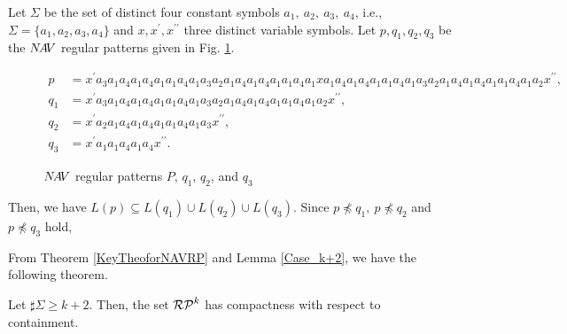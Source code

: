 \begin{ex}\label{Case_k+1}\label{反例k+1}
Let $\Sigma$ be the set of distinct four constant symbols $a_{1},~a_{2},~a_{3},~a_{4}$, i.e., $\Sigma= \{a_{1}, a_{2}, a_{3}, a_{4} \}$ and $x,x^{\prime},x^{\prime\prime}$ three distinct variable symbols.
Let $p,q_{1},q_{2},q_{3}$ be the $N\!A\!V$ regular patterns given in Fig. \ref{Fig:CounterExampleforNAVR}. 
\begin{figure*}[tb]
\begin{align*}
p & = x^{\prime}a_{3}a_{1}a_{4}a_{1}a_{4}a_{1}a_{1}a_{4}a_{1}a_{3}a_{2}a_{1}a_{4}a_{1}a_{4}a_{1}a_{1}a_{4}a_{1}xa_{1}a_{4}a_{1}a_{4}a_{1}a_{1}a_{4}a_{1}a_{3}a_{2}a_{1}a_{4}a_{1}a_{4}a_{1}a_{1}a_{4}a_{1}a_{2}x^{\prime\prime},\\
q_{1} & = x^{\prime}a_{3}a_{1}a_{4}a_{1}a_{4}a_{1}a_{1}a_{4}a_{1}a_{3}a_{2}a_{1}a_{4}a_{1}a_{4}a_{1}a_{1}a_{4}a_{1}a_{2}x^{\prime\prime},\\
q_{2} & = x^{\prime}a_{2}a_{1}a_{4}a_{1}a_{4}a_{1}a_{1}a_{4}a_{1}a_{3}x^{\prime\prime},\\
q_{3} & = x^{\prime}a_{1}a_{1}a_{4}a_{1}a_{4}x^{\prime\prime}.
\end{align*}
\caption{$N\!A\!V$ regular patterns $P$, $q_{1}$, $q_{2}$, and $q_{3}$}\label{Fig:CounterExampleforNAVR}
\end{figure*}
\noindent
Then, we have $L(p) \subseteq L(q_{1}) \cup L(q_{2}) \cup L(q_{3})$.
Since $p \not \preceq q_{1},~p \not \preceq q_{2}$ and $p \not \preceq q_{3}$ hold,


\end{ex}

From Theorem \ref{KeyTheoforNAVRP} and Lemma \ref{Case_k+2}, we have the following theorem.

\begin{thm}\label{MainTheforNAVRP}
Let $\sharp\Sigma \ge k+2$.
Then, the set $\mathcal{RP}^{k}$ has compactness with respect to containment.
\end{thm}